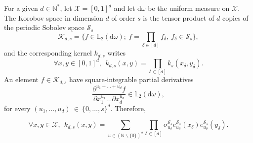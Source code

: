 \documentclass[twoside,11pt]{book}
\numberwithin{theorem}{chapter}
\numberwithin{definition}{chapter}
\numberwithin{proposition}{chapter}
\numberwithin{corollary}{chapter}
\numberwithin{example}{chapter}
\numberwithin{lemma}{chapter}
\numberwithin{assumption}{chapter}
\numberwithin{equation}{chapter}
\numberwithin{figure}{chapter}
\begin{document}
For a given $d \in \mathbb{N}^{*}$, let $\mathcal{X} = [0,1]^{d}$ and let $\mathrm{d}\omega$ be the uniform measure on $\mathcal{X}$. The Korobov space in dimension $d$ of order $s$  is the tensor product of $d$ copies of the periodic Sobolev space $\mathcal{S}_{s}$
\begin{equation}
\mathcal{K}_{d,s} = \{ f \in \mathbb{L}_{2}(\mathrm{d}\omega); \: f = \prod\limits_{\delta \in [d]} f_{\delta}, \: f_{\delta} \in \mathcal{S}_{s} \},
\end{equation}
and the corresponding kernel $k_{d,s}$ writes
\begin{equation}
\forall x,y \in [0,1]^{d}, \:\: k_{d,s}(x,y) = \prod\limits_{\delta \in [d]}k_{s}(x_{\delta},y_{\delta}).
\end{equation}
An element $f \in \mathcal{K}_{d,s}$ have square-integrable partial derivatives 
\begin{equation}
\frac{\partial^{u_{1}+ \dots + u_{d}}f}{\partial x_{1}^{u_{1}} \dots \partial x_{d}^{u_{d}}} \in \mathbb{L}_{2}(\mathrm{d}\omega),
\end{equation}
for every $(u_{1}, \dots,u_{d})~\in~\{0, \dots, s\}^{d}$. Therefore, 

\begin{equation}
\forall x,y \in \mathcal{X}, \:\:k_{d,s}(x,y) = \sum\limits_{u \in (\mathbb{N}\smallsetminus \{0\})^{d}} \prod\limits_{\delta \in [d]} \sigma_{u_{\delta}}^{\mathcal{S}_{s}} e_{u_{\delta}}^{\mathcal{S}_{s}}(x_{\delta}) e_{u_{\delta}}^{\mathcal{S}_{s}}(y_{\delta}).
\end{equation}










\end{document}
